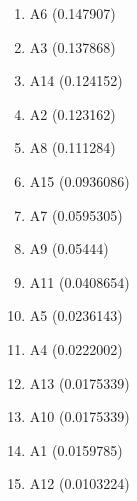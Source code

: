 \begin{enumerate}
\item A6 (0.147907)
\item A3 (0.137868)
\item A14 (0.124152)
\item A2 (0.123162)
\item A8 (0.111284)
\item A15 (0.0936086)
\item A7 (0.0595305)
\item A9 (0.05444)
\item A11 (0.0408654)
\item A5 (0.0236143)
\item A4 (0.0222002)
\item A13 (0.0175339)
\item A10 (0.0175339)
\item A1 (0.0159785)
\item A12 (0.0103224)
\end{enumerate}